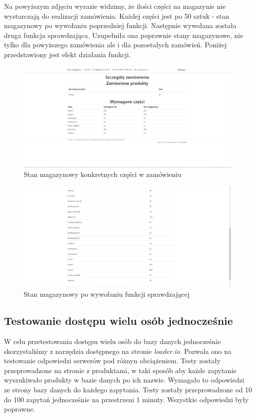 \documentclass{article}
\begin{document}
Na powyższym zdjęciu wyrazie widzimy, że ilości części na magazynie nie wystarczają do realizacji
zamówienia. Każdej części jest po 50 sztuk - stan magazynowy po wywołaniu poprzedniej funkcji.
Następnie wywołana została druga funkcja sprawdzająca.
Uzupełniła ona poprawnie stany magazynowe, nie tylko dla powyższego zamówienia ale i dla pozostałych
zamówień. Poniżej przedstawiony jest efekt działania funkcji.
\begin{figure}[H]
   \centering
   \includegraphics[width=0.99\textwidth,frame]{stan_mag_po_na specyfikacji.png}
   \caption{Stan magazynowy konkretnych części w zamówieniu}
\end{figure}

\begin{figure}[H]
   \centering
   \includegraphics[width=0.99\textwidth,frame]{magazyn po.png}
   \caption{Stan magazynowy po wywołaniu funkcji sprawdzającej}
\end{figure}


\subsection{Testowanie dostępu wielu osób jednocześnie}
W celu przetestowania dostępu wielu osób do bazy danych jednocześnie
skorzystaliśmy z narzędzia
dostępnego na stronie \textit{loader.io}. Pozwala ono na testowanie odpowiedzi
serwerów pod różnyn obciążeniem. Testy zostały przeprowadzone na stronie z
produktami, w taki sposób aby każde zapytanie wyszukiwało produkty w bazie
danych po ich nazwie. Wymagało to odpowiedzi ze strony bazy danych do każdego
zapytania. Testy zostały przeprowadzone od 10 do 100 zapytań jednocześnie na
przestrzeni 1 minuty. Wszystkie odpowiedzi były poprawne.
\end{document}
